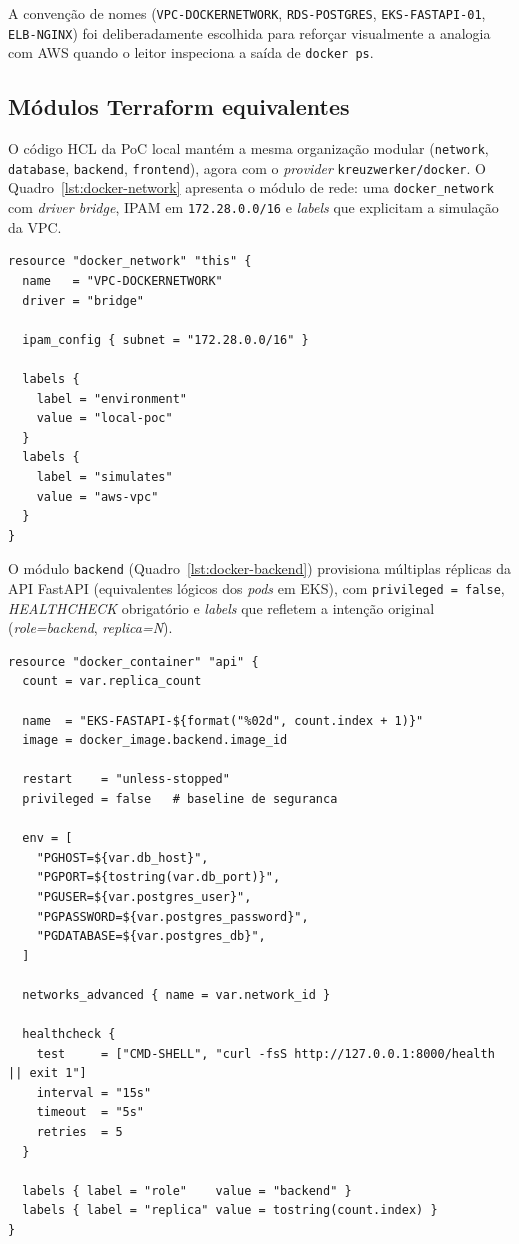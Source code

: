 A convenção de nomes (\texttt{VPC-DOCKERNETWORK}, \texttt{RDS-POSTGRES}, \texttt{EKS-FASTAPI-01}, \texttt{ELB-NGINX}) foi deliberadamente escolhida para reforçar visualmente a analogia com AWS quando o leitor inspeciona a saída de \texttt{docker ps}.

\subsection{Módulos Terraform equivalentes}

O código HCL da PoC local mantém a mesma organização modular (\texttt{network}, \texttt{database}, \texttt{backend}, \texttt{frontend}), agora com o \textit{provider} \texttt{kreuzwerker/docker}. O Quadro~\ref{lst:docker-network} apresenta o módulo de rede: uma \texttt{docker\_network} com \textit{driver bridge}, IPAM em \texttt{172.28.0.0/16} e \textit{labels} que explicitam a simulação da VPC.

\begin{lstlisting}[language=HCL,caption={Módulo \texttt{network} da PoC de contêineres (\texttt{terraform/modules/network/main.tf}).},label={lst:docker-network}]
resource "docker_network" "this" {
  name   = "VPC-DOCKERNETWORK"
  driver = "bridge"

  ipam_config { subnet = "172.28.0.0/16" }

  labels {
    label = "environment"
    value = "local-poc"
  }
  labels {
    label = "simulates"
    value = "aws-vpc"
  }
}
\end{lstlisting}

O módulo \texttt{backend} (Quadro~\ref{lst:docker-backend}) provisiona múltiplas réplicas da API FastAPI (equivalentes lógicos dos \textit{pods} em EKS), com \texttt{privileged = false}, \textit{HEALTHCHECK} obrigatório e \textit{labels} que refletem a intenção original (\textit{role=backend}, \textit{replica=N}).

\begin{lstlisting}[language=HCL,caption={Módulo \texttt{backend} da PoC de contêineres: N réplicas FastAPI com \textit{HEALTHCHECK}, sem privilégios elevados e integradas à \texttt{docker\_network} única.},label={lst:docker-backend}]
resource "docker_container" "api" {
  count = var.replica_count

  name  = "EKS-FASTAPI-${format("%02d", count.index + 1)}"
  image = docker_image.backend.image_id

  restart    = "unless-stopped"
  privileged = false   # baseline de seguranca

  env = [
    "PGHOST=${var.db_host}",
    "PGPORT=${tostring(var.db_port)}",
    "PGUSER=${var.postgres_user}",
    "PGPASSWORD=${var.postgres_password}",
    "PGDATABASE=${var.postgres_db}",
  ]

  networks_advanced { name = var.network_id }

  healthcheck {
    test     = ["CMD-SHELL", "curl -fsS http://127.0.0.1:8000/health || exit 1"]
    interval = "15s"
    timeout  = "5s"
    retries  = 5
  }

  labels { label = "role"    value = "backend" }
  labels { label = "replica" value = tostring(count.index) }
}
\end{lstlisting}

